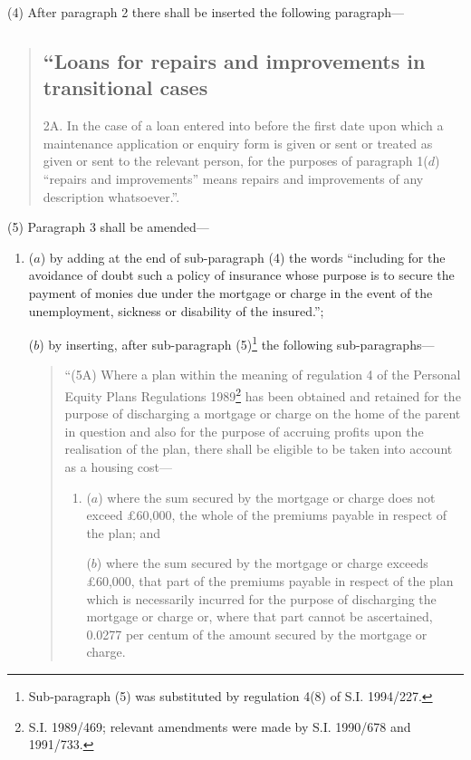 \documentclass[a4paper]{article}
\begin{document}
(4) After paragraph 2 there shall be inserted the following paragraph—
\begin{quotation}
\subsection*{“Loans for repairs and improvements in transitional cases}

2A.  In the case of a loan entered into before the first date upon which a maintenance application or enquiry form is given or sent or treated as given or sent to the relevant person, for the purposes of paragraph 1($d$) “repairs and improvements” means repairs and improvements of any description whatsoever.”.
\end{quotation}

(5) Paragraph 3 shall be amended—
\begin{enumerate}\item[]
($a$) by adding at the end of sub-paragraph (4) the words “including for the avoidance of doubt such a policy of insurance whose purpose is to secure the payment of monies due under the mortgage or charge in the event of the unemployment, sickness or disability of the insured.”;

($b$) by inserting, after sub-paragraph (5)\footnote{\frenchspacing Sub-paragraph (5) was substituted by regulation 4(8) of S.I. 1994/227.} the following sub-paragraphs—
\begin{quotation}
“(5A) Where a plan within the meaning of regulation 4 of the Personal Equity Plans Regulations 1989\footnote{\frenchspacing S.I. 1989/469; relevant amendments were made by S.I. 1990/678 and 1991/733.} has been obtained and retained for the purpose of discharging a mortgage or charge on the home of the parent in question and also for the purpose of accruing profits upon the realisation of the plan, there shall be eligible to be taken into account as a housing cost—
\begin{enumerate}\item[]
($a$) where the sum secured by the mortgage or charge does not exceed £60,000, the whole of the premiums payable in respect of the plan; and

($b$) where the sum secured by the mortgage or charge exceeds £60,000, that part of the premiums payable in respect of the plan which is necessarily incurred for the purpose of discharging the mortgage or charge or, where that part cannot be ascertained, 0.0277 per centum of the amount secured by the mortgage or charge.
\end{enumerate}


\end{quotation}
\end{enumerate}
\end{document}
